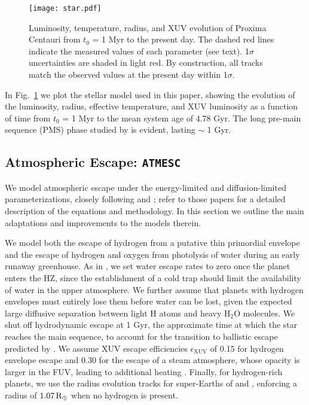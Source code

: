\documentclass[preprint,12pt]{aastex}
\def\rearth{{\rm\,R_\oplus}}
\def\atmesc{\texttt{\footnotesize{ATMESC}}\xspace}
\begin{document}
\begin{figure}[ht]
\centering
\texttt{[image: star.pdf]}
\caption{Luminosity, temperature, radius, and XUV evolution of Proxima
  Centauri from $t_0$ = 1 Myr to the present day. The dashed red lines
  indicate the measured values of each parameter (see text). 1$\sigma$
  uncertainties are shaded in light red. By construction, all tracks
  match the observed values at the present day within 1$\sigma$.}
\label{fig:stellar:evol}
\end{figure}

In Fig.~\ref{fig:stellar:evol} we plot the stellar model used in this
paper, showing the evolution of the luminosity, radius, effective
temperature, and XUV luminosity as a function of time from $t_0$ = 1
Myr to the mean system age of 4.78 Gyr. The long pre-main sequence
(PMS) phase studied by \cite{LugerBarnes15} is evident, lasting $\sim$ 
1 Gyr.

\subsection{Atmospheric Escape: \atmesc}
\label{sec:models:atmesc}

We model atmospheric escape under the energy-limited \citep{Watson81,Erkaev07} and
diffusion-limited \citep{Hunten73} parameterizations, closely following \cite{Luger15}
and \cite{LugerBarnes15}; refer to those papers for a detailed
description of the equations and methodology. In this section we
outline the main adaptations and improvements to the models therein.

We model both the escape of hydrogen from a putative thin primordial
envelope and the escape of hydrogen and oxygen from photolysis of
water during an early runaway greenhouse. As in \cite{LugerBarnes15},
we set water escape rates to zero once the planet enters the HZ, since
the establishment of a cold trap should limit the availability of
water in the upper atmosphere. We further assume that planets with
hydrogen envelopes must entirely lose them before water can be lost,
given the expected large diffusive separation between light H atoms
and heavy H$_2$O molecules.  We shut off hydrodynamic escape at 1 Gyr,
the approximate time at which the star reaches the main sequence, to
account for the transition to ballistic escape predicted by
\cite{OwenMohanty16}. We assume XUV escape efficiencies
$\epsilon_\mathrm{XUV}$ of 0.15 for hydrogen envelope escape and 0.30
for the escape of a steam atmosphere, whose opacity is larger in the
FUV, leading to additional heating \citep{Sekiya81}. Finally, for
hydrogen-rich planets, we use the radius evolution tracks for
super-Earths of \cite{Lopez12} and \cite{LopezFortney14}, enforcing a
radius of $1.07 \rearth$ when no hydrogen is present.
\end{document}
